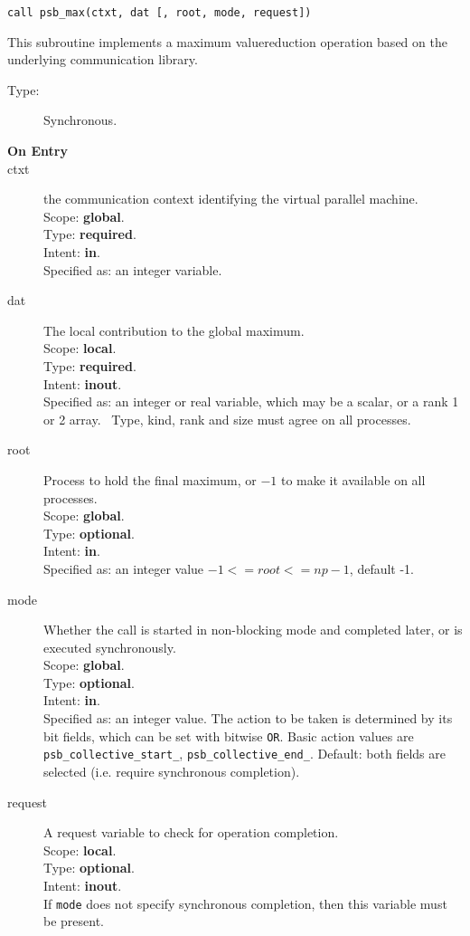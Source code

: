 \begin{verbatim}
call psb_max(ctxt, dat [, root, mode, request])
\end{verbatim}

This subroutine implements a maximum valuereduction
operation based on the underlying communication library. 
\begin{description}
\item[Type:] Synchronous.
\item[\bf  On Entry ]
\item[ctxt] the communication context identifying the virtual
  parallel machine.\\
Scope: {\bf global}.\\
Type: {\bf required}.\\
Intent: {\bf in}.\\
Specified as: an integer variable.
\item[dat] The local contribution to the global maximum.\\
Scope: {\bf local}.\\
Type: {\bf required}.\\
Intent: {\bf inout}.\\
Specified as: an integer or  real variable, which may be a
scalar, or a rank 1 or 2 array. \
Type, kind, rank and size must agree on all processes.
\item[root] Process to hold the final maximum, or $-1$ to make it available
  on all processes.\\
Scope: {\bf global}.\\
Type: {\bf optional}.\\
Intent: {\bf in}.\\
Specified as: an integer value $-1<= root <= np-1$, default -1. \\
\item[mode] Whether the call is started in non-blocking mode and completed
  later, or is executed synchronously.\\
Scope: {\bf global}.\\
Type: {\bf optional}.\\
Intent: {\bf in}.\\
Specified as: an integer value. The action to be taken is determined
by its bit fields, which can be set with bitwise \verb|OR|. Basic
action values are \verb|psb_collective_start_|, \verb|psb_collective_end_|.
Default:  both fields are selected (i.e. require synchronous completion).\\
\item[request] A request variable to check for operation completion.\\
Scope: {\bf local}.\\
Type: {\bf optional}.\\
Intent: {\bf inout}.\\
If \verb|mode| does not specify synchronous completion, then this
variable must be present.
\end{description}


